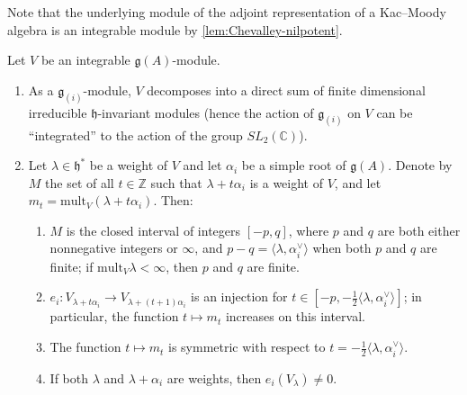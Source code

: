 \documentclass[12pt]{article}
\begin{document}
Note that the underlying module of the adjoint representation of a Kac--Moody algebra is an integrable module by \ref{lem:Chevalley-nilpotent}.

\begin{proposition}\label{prop:weights-integrable}
Let $V$ be an integrable $\mathfrak{g}(A)$-module.
\begin{enumerate}[label=(\alph*)]
\item As a $\mathfrak{g}_{(i)}$-module, $V$ decomposes into a direct sum of finite dimensional irreducible 
$\mathfrak{h}$-invariant modules (hence the action of $\mathfrak{g}_{(i)}$ on $V$ can be ``integrated'' 
to the action of the group $SL_2(\mathbb{C})$).

\item Let $\lambda \in \mathfrak{h}^*$ be a weight of $V$ and let $\alpha_i$ be a simple root of $\mathfrak{g}(A)$. 
Denote by $M$ the set of all $t \in \mathbb{Z}$ such that $\lambda+t\alpha_i$ is a weight of $V$, and let 
$m_t = \mathrm{mult}_V(\lambda+t\alpha_i)$. Then:
\begin{enumerate}[label=(\roman*)]
\item $M$ is the closed interval of integers $[-p,q]$, where $p$ and $q$ are both either nonnegative integers or $\infty$, 
and $p-q=\langle \lambda,\alpha_i^\vee\rangle$ when both $p$ and $q$ are finite; if $\mathrm{mult}_V\lambda<\infty$, then $p$ and $q$ are finite.

\item $e_i: V_{\lambda+t\alpha_i}\to V_{\lambda+(t+1)\alpha_i}$ is an injection for $t\in[-p,-\tfrac{1}{2}\langle\lambda,\alpha_i^\vee\rangle]$; 
in particular, the function $t\mapsto m_t$ increases on this interval.

\item The function $t\mapsto m_t$ is symmetric with respect to $t=-\tfrac{1}{2}\langle\lambda,\alpha_i^\vee\rangle$.

\item If both $\lambda$ and $\lambda+\alpha_i$ are weights, then $e_i(V_\lambda)\neq 0$.
\end{enumerate}
\end{enumerate}
\end{proposition}
\end{document}
